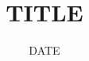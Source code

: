 \documentclass[12pt,letterpaper,answers,initials]{test}
\title{TITLE}
\date{DATE}
\begin{document}
  \begin{questions}
    
  \end{questions}
\end{document}
